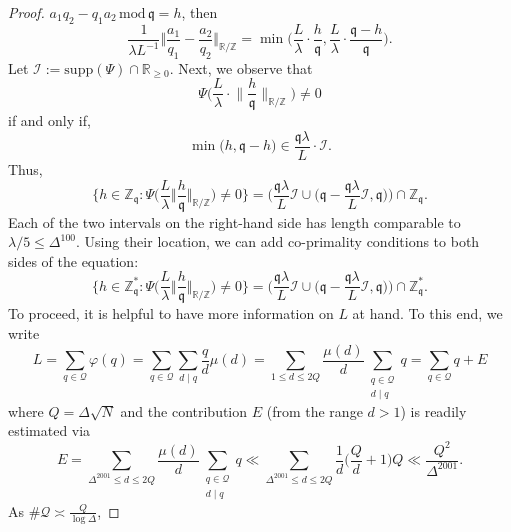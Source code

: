 \documentclass[10pt,a4paper]{amsart}
\begin{document}
\begin{proof}
$ a_1 q_2 - q_1 a_2 \,\mathrm{mod}\, \mathfrak{q} = h$, then
$$
\frac{1}{\lambda L^{-1}}
\Big \Vert \frac{a_1}{q_1} - 
\frac{a_2}{q_2} \Big\Vert_{\mathbb{R}/\mathbb{Z}}
= 
\min\Big( \frac{L}{\lambda}\cdot \frac{h}{\mathfrak{q}},
 \frac{L}{\lambda}\cdot  \frac{\mathfrak{q}-h}{\mathfrak{q}} \Big).
$$
Let $\mathcal{I}:=\mathrm{supp}(\Psi) \cap \mathbb{R}_{\geq 0}$. Next, we 
observe that
$$
\Psi \Big ( \frac{L}{\lambda} \cdot \Big \| \frac{h}{\mathfrak{q}} \Big \|_{\mathbb{R} / \mathbb{Z}} \Big ) \neq 0
$$
if and only if,
$$
\min \Big (h, \mathfrak{q} - h \Big ) \in \frac{\mathfrak{q} \lambda}{L} \cdot \mathcal{I}.
$$
Thus,
$$
\Bigg\{h \in \mathbb{Z}_\mathfrak{q}: 
\Psi\Big( \frac{L}{\lambda}
\Big \Vert \frac{h}{\mathfrak{q}} 
\Big\Vert_{\mathbb{R}/\mathbb{Z}}\Big)
\neq 0
\Bigg\}
=
\Big(\frac{\mathfrak{q} \lambda}{L}
\mathcal{I}\cup 
\big(\mathfrak{q} - 
\frac{\mathfrak{q} \lambda}{L} \mathcal{I},
\mathfrak{q}\big)\Big)
\cap \mathbb{Z}_\mathfrak{q}.
$$
Each of the two intervals on the right-hand side has length comparable to
$\lambda/5 \leq \Delta^{100}$.
Using their location, we can add co-primality conditions to
both sides of the equation:
$$
\Bigg\{h \in \mathbb{Z}_\mathfrak{q}^*: 
\Psi\Big( \frac{L}{\lambda} \Big \Vert  
\frac{h}{\mathfrak{q}} \Big\Vert_{\mathbb{R}/\mathbb{Z}}\Big)
\neq 0
\Bigg\}
=
\Big(\frac{\mathfrak{q}\lambda}{L}
\mathcal{I}\cup 
\big(\mathfrak{q} - 
\frac{\mathfrak{q} \lambda}{L}\mathcal{I},
\mathfrak{q}\big)\Big)
\cap \mathbb{Z}^*_\mathfrak{q}.
$$
To proceed, it is helpful to have more information 
on $L$ at hand. To this end, we write 
$$
L = \sum_{q \in \mathcal{Q}} \varphi(q) = \sum_{q\in \mathcal{Q}} \sum_{d\mid q} \frac{q}{d} \mu (d)
=\sum_{1 \leq  d \leq 2Q} 
 \frac{\mu (d)}{d}
\sum_{
\substack{q\in \mathcal{Q}\\
d\mid q}}  q
= 
\sum_{q\in \mathcal{Q}}  q
+ 
E
$$
where $Q = \Delta \sqrt{N}$ and the contribution $E$ (from the range $d>1$) is readily estimated via
$$
E= 
\sum_{\Delta^{2001} \leq  d \leq 2Q} 
 \frac{\mu (d)}{d}
\sum_{
\substack{q\in \mathcal{Q}\\
d\mid q}}  q\ll 
\sum_{\Delta^{2001} \leq d \leq 2Q} 
 \frac{1}{d}
\Big( \frac{Q}{d} + 1 \Big) Q
\ll \frac{Q^2}{\Delta^{2001}}.
$$
As
$\#\mathcal{Q}\asymp \frac{Q}{\log \Delta}$,

\end{proof}
\end{document}
